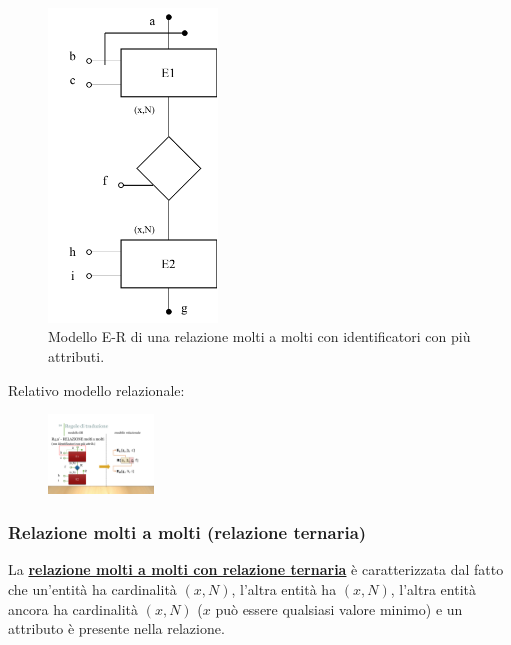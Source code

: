 \documentclass[a4paper]{article}
\begin{document}
	\begin{figure}[!htp]
		\centering
		\includegraphics[width=0.4\textwidth]{img/relazionale_molti_a_molti_attributi.pdf}
		\caption{Modello E-R di una relazione molti a molti con identificatori con più attributi.}
	\end{figure}
	
	\noindent
	Relativo modello relazionale:
	
	\begin{figure}[!htp]
		\centering
		\includegraphics[width=0.25\textwidth]{img/relazionale_molti_a_molti_attributi2.pdf}
	\end{figure}

	\newpage
	
	\subsubsection{Relazione molti a molti (relazione ternaria)}
	
	La \textcolor{Red3}{\textbf{\underline{relazione molti a molti con relazione ternaria}}} è caratterizzata dal fatto che un'entità ha cardinalità $\left(x,N\right)$, l'altra entità ha $\left(x,N\right)$, l'altra entità ancora ha cardinalità $\left(x,N\right)$ ($x$ può essere qualsiasi valore minimo) e un attributo è presente nella relazione.
	
\end{document}
